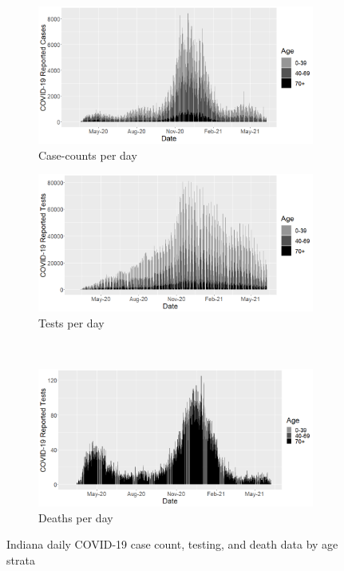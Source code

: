 \documentclass[11pt]{amsart}
\numberwithin{equation}{section}
\theoremstyle{plain}
\begin{document}
 \begin{figure}[!th]
 \centering
 \begin{subfigure}{.45\textwidth}
  \centering
  \includegraphics[width=.9\linewidth]{../figs/indianacasecounts_byage.png}
  \caption{Case-counts per day}
  \label{fig:in-cases}
 \end{subfigure}
 \begin{subfigure}{.45\textwidth}
  \centering
  \includegraphics[width=.9\linewidth]{../figs/indianacovidtests_byage.png}
 \caption{Tests per day}
 \label{fig:in-tests}
 \end{subfigure} \\ [1ex]
 \begin{subfigure}{\linewidth}
 \centering
 \includegraphics[width=.45\linewidth]{../figs/indianadeaths_byage.png}
  \caption{Deaths per day}
  \label{fig:in-deaths}
 \end{subfigure}
 \caption{Indiana daily COVID-19 case count, testing, and death data by age strata}
 \label{fig:in-data}
 \end{figure}
\end{document}
